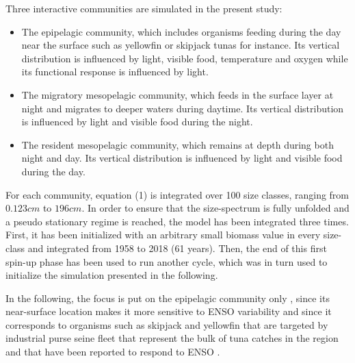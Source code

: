%
%

Three interactive communities are simulated in the present study:
\begin{itemize}
\item{The epipelagic community, which includes organisms feeding during the day near the surface such as yellowfin or skipjack tunas for instance. Its vertical distribution is influenced by light, visible food, temperature and oxygen while its functional response is influenced by light.}
\item{The migratory mesopelagic community, which feeds in the surface layer at night and migrates to deeper waters during daytime. Its vertical distribution is influenced by light and visible food during the night.}
\item{The resident mesopelagic community, which remains at depth during both night and day. Its vertical distribution is influenced by light and visible food during the day.}
\end{itemize}

For each community, equation (1) is integrated over 100 size classes, ranging from $0.123cm$ to $196cm$. In order to ensure that the size-spectrum is fully unfolded and a pseudo stationary regime is reached, the model has been integrated three times. First, it has been initialized with an arbitrary small biomass value in every size-class and integrated from 1958 to 2018 (61 years). Then, the end of this first spin-up phase has been used to run another cycle, which was in turn used to initialize the simulation presented in the following.


In the following, the focus is put on the epipelagic community only , since its near-surface location makes it more sensitive to ENSO variability \citep{lemezoNaturalVariabilityMarine2016} and since it corresponds to organisms such as skipjack and yellowfin that are targeted by industrial purse seine fleet that represent the bulk of tuna catches in the region and that have been reported to respond to ENSO \citep{lehodeyNinoSouthernOscillation1997}.
